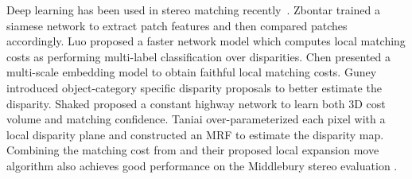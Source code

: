 \documentclass[10pt,twocolumn,letterpaper]{article}
\begin{document}
Deep learning  has  been used in stereo matching recently~\cite{zagoruyko2015learning,zbontar2015computing,luo2016efficient,chen2015deep,shaked2016improved,taniai2016continuous}. Zbontar \etal \cite{zbontar2015computing} trained a siamese network to extract patch features   and then compared  patches accordingly. Luo \etal \cite{luo2016efficient} proposed a faster network model which  computes local matching costs as performing  multi-label classification over disparities.  Chen \etal
\cite{chen2015deep} presented a multi-scale embedding model to obtain faithful local matching costs. Guney \etal \cite{Guney2015CVPR}  introduced object-category specific disparity proposals to better estimate the disparity.  Shaked \etal \cite{shaked2016improved} proposed a constant highway network to learn both 3D cost volume and  matching confidence. Taniai \etal \cite{taniai2016continuous} over-parameterized each pixel with a local disparity plane and constructed an MRF to estimate the disparity map. Combining the matching cost from \cite{zbontar2015computing} and their proposed local expansion move algorithm also achieves  good performance on the Middlebury stereo evaluation \cite{scharstein2002middlebury}.
\end{document}

